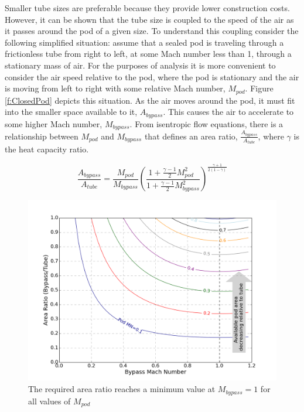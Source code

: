 \documentclass[heading.tex]{subfiles}
\begin{document}
Smaller tube sizes are preferable because they provide lower construction costs. However, it can be shown that 
the tube size is coupled to the speed of the air as it passes around the pod of a given size. 
To understand this coupling consider the following simplified situation: assume that a sealed pod
is traveling through a frictionless tube from right to left, at some Mach number less than 1, through a stationary mass of air. 
For the purposes of analysis it is more convenient to consider the air speed relative to the pod, 
where the pod is stationary and the air is moving from left to right with some relative Mach number, $M_{pod}$. 
Figure \ref{f:ClosedPod} depicts this situation.
As the air moves around the pod, it must fit into the smaller space available to it, $A_{bypass}$.
This causes the air to accelerate to some higher Mach number, $M_{bypass}$.
From isentropic flow equations, there is a relationship between 
$M_{pod}$ and $M_{bypass}$ that defines an area ratio, $\frac{A_{bypass}}{A_{tube}}$, where $\gamma$ is the heat capacity ratio.

\begin{equation}
\frac{A_{bypass}}{A_{tube}} = \frac{M_{pod}}{M_{bypass}}
\left(\frac{1+ \frac{\gamma-1}{2} M_{pod\ \ \ }^2}
{1+ \frac{\gamma-1}{2} M_{bypass}^2}\right)^{\frac{\gamma+1}{2\left(1-\gamma\right)}}
\label{e:a-over-astar}
\end{equation}

\begin{figure}[!htb]
  \centering
  \includegraphics[width=.9\textwidth]{images/areaPlot.png}
  \caption{The required area ratio reaches a minimum value at $M_{bypass}=1$ for all values of $M_{pod}$}
  \label{f:choked-flow}
\end{figure}
\end{document}
